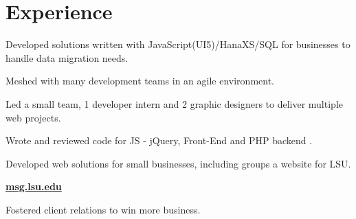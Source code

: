 \documentclass[]{deedy-resume-openfont}
\begin{document}
\hfill
\begin{minipage}[t]{0.66\textwidth} 


\section{Experience}
\vspace{\topsep} %
\vspace{\topsep} %
\begin{tightemize}
\item Developed solutions written with JavaScript(UI5)/HanaXS/SQL for businesses to handle data migration needs.
\item Meshed with many development teams in an agile environment.
\end{tightemize}
\sectionsep

\vspace{\topsep} %
\begin{tightemize}
\item Led a small team, 1 developer intern and 2 graphic designers to deliver multiple web projects.
\item Wrote and reviewed code for JS - jQuery, Front-End and PHP backend .
\end{tightemize}
\sectionsep

\begin{tightemize}
\item Developed web solutions for small businesses, including groups a website for LSU.
\item \href{https://msg.lsu.edu}{\bf msg.lsu.edu}
\item Fostered client relations to win more business.
\end{tightemize}
\sectionsep



\end{minipage}
\end{document}
